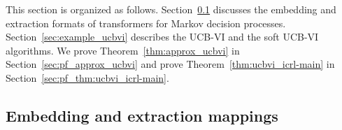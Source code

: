 \documentclass[10pt]{article}
\newcommand{\<}{\left\langle}
\renewcommand{\>}{\right\rangle}
\begin{document}
This section is organized as follows. Section~\ref{sec:tf_embed_mdp} discusses the embedding and extraction formats of transformers for Markov decision processes. Section~\ref{sec:example_ucbvi} describes the UCB-VI and the soft UCB-VI algorithms.  We prove Theorem~\ref{thm:approx_ucbvi} in Section~\ref{sec:pf_approx_ucbvi} and prove Theorem~\ref{thm:ucbvi_icrl-main} in Section~\ref{sec:pf_thm:ucbvi_icrl-main}.
















\subsection{Embedding and extraction mappings}\label{sec:tf_embed_mdp}
\end{document}
